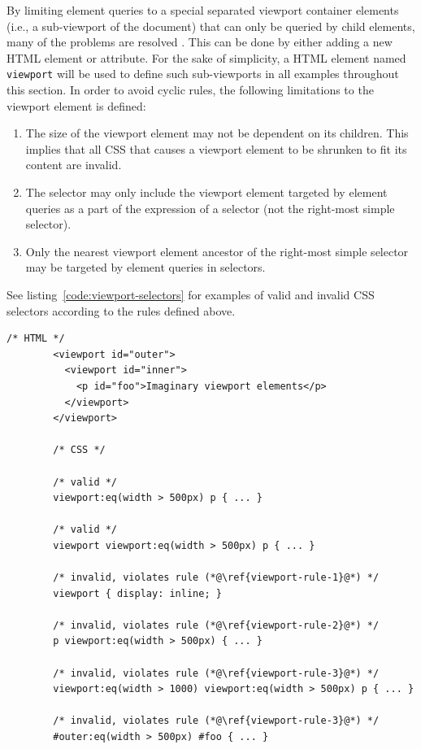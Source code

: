 \documentclass[a4paper,11pt]{kth-mag}
\newcommand{\code}[1]{\texttt{#1}}
\begin{document}
      By limiting element queries to a special separated \gls{viewport} container \glspl{element} (i.e., a sub-\gls{viewport} of the \gls{document}) that can only be queried by child \glspl{element}, many of the problems are resolved \cite{w3c_eq_mail,ricg_irc_log,ricg_issue_viewport}.
      This can be done by either adding a new \gls{HTML} element or attribute.
      For the sake of simplicity, a \gls{HTML} element named \code{viewport} will be used to define such sub-\glspl{viewport} in all examples throughout this section.
      In order to avoid cyclic rules, the following limitations to the \gls{viewport} element is defined:
      \begin{enumerate}
        \item\label{viewport-rule-1} The size of the \gls{viewport} element may not be dependent on its children. This implies that all \gls{CSS} that causes a \gls{viewport} \gls{element} to be shrunken to fit its content are invalid.
        \item\label{viewport-rule-2} The selector may only include the \gls{viewport} \gls{element} targeted by element queries as a part of the expression of a selector (not the right-most simple selector).
        \item\label{viewport-rule-3} Only the nearest \gls{viewport} element ancestor of the right-most simple selector may be targeted by element queries in selectors.
      \end{enumerate}
      See listing~\ref{code:viewport-selectors} for examples of valid and invalid CSS selectors according to the rules defined above.
      \begin{lstlisting}[gobble=8,caption={Examples of valid and invalid selectors with the \gls{viewport} \gls{element}.}, captionpos=b, label={code:viewport-selectors}]
        /* HTML */
        <viewport id="outer">
          <viewport id="inner">
            <p id="foo">Imaginary viewport elements</p>
          </viewport>
        </viewport>

        /* CSS */

        /* valid */
        viewport:eq(width > 500px) p { ... }

        /* valid */
        viewport viewport:eq(width > 500px) p { ... }

        /* invalid, violates rule (*@\ref{viewport-rule-1}@*) */
        viewport { display: inline; }

        /* invalid, violates rule (*@\ref{viewport-rule-2}@*) */
        p viewport:eq(width > 500px) { ... }

        /* invalid, violates rule (*@\ref{viewport-rule-3}@*) */
        viewport:eq(width > 1000) viewport:eq(width > 500px) p { ... }

        /* invalid, violates rule (*@\ref{viewport-rule-3}@*) */
        #outer:eq(width > 500px) #foo { ... }
      \end{lstlisting}
\end{document}

